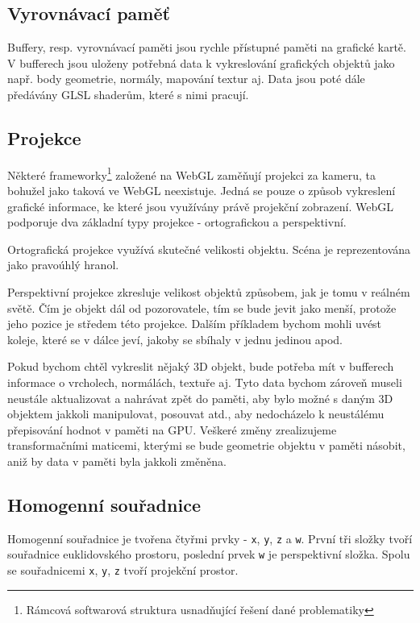 \subsection{Vyrovnávací paměť}
Buffery, resp. vyrovnávací paměti jsou rychle přístupné paměti na grafické kartě. V bufferech jsou  uloženy potřebná data k vykreslování grafických objektů jako např. body geometrie, normály, mapování textur aj. Data jsou poté dále předávány GLSL shaderům, které s nimi pracují.


\newpage

\subsection{Projekce}
Některé frameworky\footnote{Rámcová softwarová struktura usnadňující řešení dané problematiky} založené na WebGL zaměňují projekci za kameru, ta bohužel jako taková ve WebGL neexistuje. Jedná se pouze o způsob vykreslení grafické informace, ke které jsou využívány právě projekční zobrazení. WebGL podporuje dva základní typy projekce - ortografickou a perspektivní. 

Ortografická projekce využívá skutečné velikosti objektu. Scéna je reprezentována jako pravoúhlý hranol.

Perspektivní projekce zkresluje velikost objektů způsobem, jak je tomu v reálném světě. Čím je objekt dál od pozorovatele, tím se bude jevit jako menší, protože jeho pozice je středem této projekce. Dalším příkladem bychom mohli uvést koleje, které se v dálce jeví, jakoby se sbíhaly v jednu jedinou apod.
  
Pokud bychom chtěl vykreslit nějaký 3D objekt, bude potřeba mít v bufferech informace o vrcholech, normálách, textuře aj. Tyto data bychom zároveň museli neustále aktualizovat a nahrávat zpět do paměti, aby bylo možné s daným 3D objektem jakkoli manipulovat, posouvat atd., aby nedocházelo k neustálému přepisování hodnot v paměti na GPU. Veškeré změny zrealizujeme transformačními maticemi, kterými se bude geometrie objektu v paměti násobit, aniž by data v paměti byla jakkoli změněna.

\subsection{Homogenní souřadnice}
Homogenní souřadnice je tvořena čtyřmi prvky - \texttt{x}, \texttt{y}, \texttt{z} a \texttt{w}. První tři složky tvoří souřadnice euklidovského prostoru, poslední prvek \texttt{w} je perspektivní složka. Spolu se souřadnicemi \texttt{x}, \texttt{y}, \texttt{z} tvoří projekční prostor.\cite{WebGLbeg}

